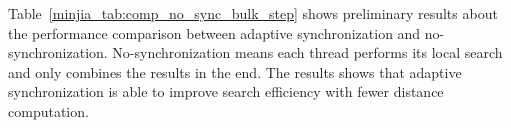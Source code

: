 %
%

%
%
%

Table~\ref{minjia_tab:comp_no_sync_bulk_step} shows preliminary results about the performance comparison between adaptive synchronization and no-synchronization. No-synchronization means each thread performs its local search and only combines the results in the end. The results shows that adaptive synchronization is able to improve search efficiency with fewer distance computation.

